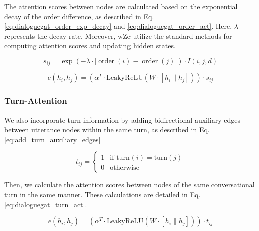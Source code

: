 \documentclass[letterpaper]{article} %
\begin{document}

The attention scores between nodes are calculated based on the exponential decay of the order difference, as described in Eq. \ref{eq:dialoguegat_order_exp_decay} and \ref{eq:dialoguegat_order_act}. Here, $\lambda$ represents the decay rate. Moreover, wZe utilize the standard methods for computing attention scores and updating hidden states. 

\begin{equation}\label{eq:dialoguegat_order_exp_decay}
    s_{ij} = \exp(-\lambda \cdot |\operatorname{order}(i) - \operatorname{order}(j)|) \cdot I(i, j, d)
\end{equation}

\begin{equation}\label{eq:dialoguegat_order_act}
    e(h_i, h_j) = (\alpha^T \cdot \text{LeakyReLU}(W \cdot [h_i \parallel h_j])) \cdot s_{ij}
\end{equation}

\subsubsection{Turn-Attention}
We also incorporate turn information by adding bidirectional auxiliary edges between utterance nodes within the same turn, as described in Eq. \ref{eq:add_turn_auxiliary_edges}

\begin{equation}\label{eq:add_turn_auxiliary_edges}
    t_{ij} = 
    \begin{cases} 
    1 & \text{if } \text{turn}(i) = \text{turn}(j) \\
    0 & \text{otherwise}
    \end{cases}
\end{equation}

Then, we calculate the attention scores between nodes of the same conversational turn in the same manner. These calculations are detailed in Eq. \ref{eq:dialoguegat_turn_act}.

\begin{equation}\label{eq:dialoguegat_turn_act}
    e(h_i, h_j) = (\alpha^T \cdot \text{LeakyReLU}(W \cdot [h_i \parallel h_j])) \cdot t_{ij}
\end{equation}
\end{document}
